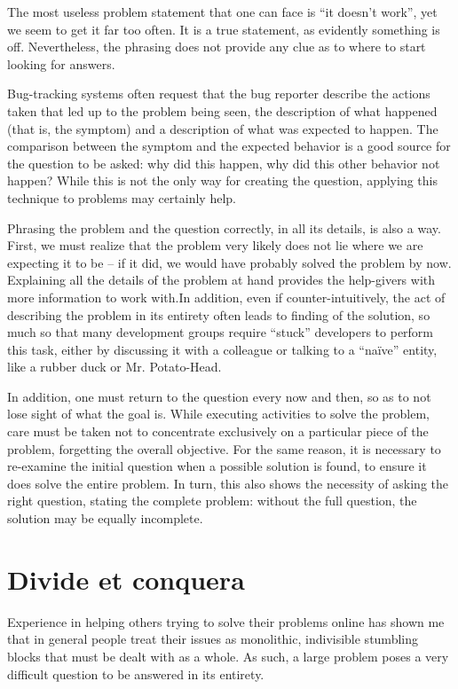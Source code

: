 The most useless problem statement that one can face is ``it doesn’t work'', yet we seem to get it far too often. It is a true statement, as evidently something is off. Nevertheless, the phrasing does not provide any clue as to where to start looking for answers.

Bug-tracking systems often request that the bug reporter describe the actions taken that led up to the problem being seen, the description of what happened (that is, the symptom) and a description of what was expected to happen. The comparison between the symptom and the expected behavior is a good source for the question to be asked: why did this happen, why did this other behavior not happen? While this is not the only way for creating the question, applying this technique to problems may certainly help.

Phrasing the problem and the question correctly, in all its details, is also a way. First, we must realize that the problem very likely does not lie where we are expecting it to be -- if it did, we would have probably solved the problem by now. Explaining all the details of the problem at hand provides the help-givers with more information to work with.In addition, even if counter-intuitively, the act of describing the problem in its entirety often leads to finding of the solution, so much so that many development groups require ``stuck'' developers to perform this task, either by discussing it with a colleague or talking to a ``naïve'' entity, like a rubber duck or Mr. Potato-Head.

In addition, one must return to the question every now and then, so as to not lose sight of what the goal is. While executing activities to solve the problem, care must be taken not to concentrate exclusively on a particular piece of the problem, forgetting the overall objective. For the same reason, it is necessary to re-examine the initial question when a possible solution is found, to ensure it does solve the entire problem. In turn, this also shows the necessity of asking the right question, stating the complete problem: without the full question, the solution may be equally incomplete.

\section*{Divide et conquera}

Experience in helping others trying to solve their problems online has shown me that in general people treat their issues as monolithic, indivisible stumbling blocks that must be dealt with as a whole. As such, a large problem poses a very difficult question to be answered in its entirety.

